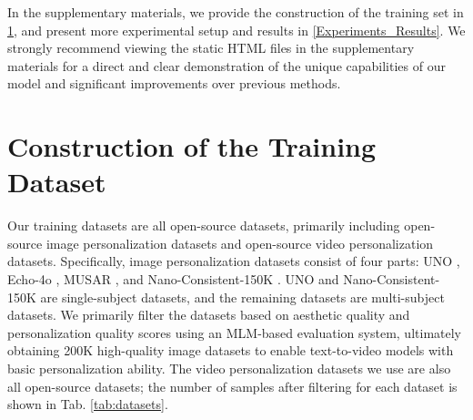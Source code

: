 In the supplementary materials, we provide the construction of the training set in \cref{TrainingSet}, and present more experimental setup and results in \cref{Experiments_Results}. We strongly recommend viewing the static HTML files in the supplementary materials for a direct and clear demonstration of the unique capabilities of our model and significant improvements over previous methods.



\section{Construction of the Training Dataset}
\label{TrainingSet}

Our training datasets are all open-source datasets, primarily including open-source image personalization datasets and open-source video personalization datasets. Specifically, image personalization datasets consist of four parts: UNO \cite{UNO}, Echo-4o \cite{echo-4o}, MUSAR \cite{musar}, and Nano-Consistent-150K \cite{echo-4o}. UNO and Nano-Consistent-150K are single-subject datasets, and the remaining datasets are multi-subject datasets. We primarily filter the datasets based on aesthetic quality and personalization quality scores using an MLM-based evaluation system, ultimately obtaining 200K high-quality image datasets to enable text-to-video models with basic personalization ability. The video personalization datasets we use are also all open-source datasets; the number of samples after filtering for each dataset is shown in Tab. \ref{tab:datasets}.





\begin{table}[ht]
  \caption{Detailed description of the training dataset.}
  \label{tab:datasets}
  \centering
\end{table}



